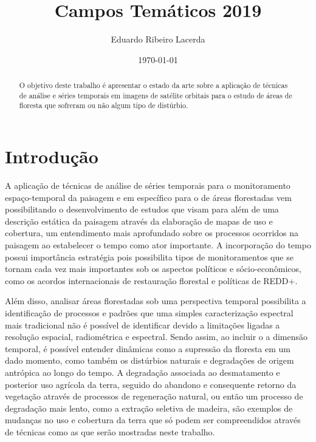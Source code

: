 \documentclass{article}
\title{Campos Temáticos 2019}
\author{Eduardo Ribeiro Lacerda }
\date{\today}
\begin{document}
\maketitle

\begin{abstract}
O objetivo deste trabalho é apresentar o estado da arte sobre a aplicação de técnicas de análise e séries temporais em imagens de satélite orbitais para o estudo de áreas de floresta que sofreram ou não algum tipo de distúrbio.    
\end{abstract}

\section{Introdução}
A aplicação de técnicas de análise de séries temporais para o monitoramento espaço-temporal da paisagem e em específico para o de áreas florestadas vem possibilitando o desenvolvimento de estudos que visam para além de uma descrição estática da paisagem através da elaboração de mapas de uso e cobertura, um entendimento mais aprofundado sobre os processos ocorridos na paisagem ao estabelecer o tempo como ator importante. A incorporação do tempo possui importância estratégia pois possibilita tipos de monitoramentos que se tornam cada vez mais importantes sob os aspectos políticos e sócio-econômicos, como os acordos internacionais de restauração florestal e políticas de REDD+. 
\par
Além disso, analisar áreas florestadas sob uma perspectiva temporal possibilita a identificação de processos e padrões que uma simples caracterização espectral mais tradicional não é possível de identificar devido a limitações ligadas a resolução espacial, radiométrica e espectral. Sendo assim, ao incluir o a dimensão temporal, é possível entender dinâmicas como a supressão da floresta em um dado momento, como também os distúrbios naturais e degradações de origem antrópica ao longo do tempo.
A degradação associada ao desmatamento e posterior uso agrícola da terra, seguido do abandono e consequente retorno da vegetação através de processos de regeneração natural, ou então um processo de degradação mais lento, como a extração seletiva de madeira, são exemplos de mudanças no uso e cobertura da terra que só podem ser compreendidos através de técnicas como as que serão mostradas neste trabalho. \par
\end{document}
